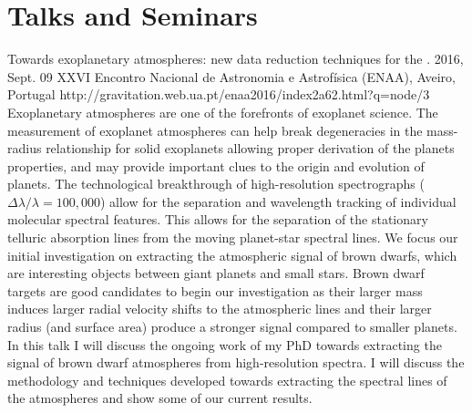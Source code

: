 \section{Talks and Seminars}\label{app_sec:talks}

{Towards exoplanetary atmospheres: new data reduction techniques for the \nir{}.} %
{2016, Sept. 09}%
{XXVI Encontro Nacional de Astronomia e Astrofísica (ENAA), Aveiro, Portugal}%
{http://gravitation.web.ua.pt/enaa2016/index2a62.html?q=node/3}%
{}%
{Exoplanetary atmospheres are one of the forefronts of exoplanet science.
The measurement of exoplanet atmospheres can help break degeneracies in the mass-radius relationship for solid exoplanets allowing proper derivation of the planets properties, and may provide important clues to the origin and evolution of planets.
The technological breakthrough of high-resolution spectrographs ($\Delta \lambda / \lambda = 100,000$) allow for the separation and wavelength tracking of individual molecular spectral features.
This allows for the separation of the stationary telluric absorption lines from the moving planet-star spectral lines.
We focus our initial investigation on extracting the atmospheric signal of brown dwarfs, which are interesting objects between giant planets and small stars.
Brown dwarf targets are good candidates to begin our investigation as their larger mass induces larger radial velocity shifts to the atmospheric lines and their larger radius (and surface area) produce a stronger signal compared to smaller planets.
In this talk I will discuss the ongoing work of my PhD towards extracting the signal of brown dwarf atmospheres from high-resolution \nir{}spectra.
I will discuss the methodology and techniques developed towards extracting the spectral lines of the atmospheres and show some of our current results.}%


